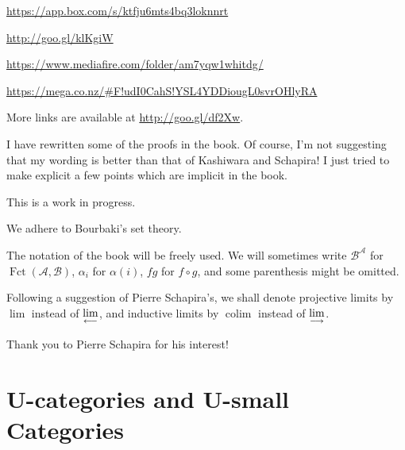 \documentclass[12pt]{article}%
\theoremstyle{remark}
\newtheorem{rk}[thm]{Remark}
\theoremstyle{definition}
\newcommand{\nn}{\noindent}
\newcommand{\A}{\mathcal A}
\newcommand{\B}{\mathcal B}
\newcommand{\ilim}{\operatornamewithlimits{\underset{\longrightarrow}{lim}}}
\newcommand{\plim}{\operatornamewithlimits{\underset{\longleftarrow}{lim}}}
\DeclareMathOperator*{\colim}{colim}
\DeclareMathOperator{\Fct}{Fct}
\begin{document}
\noindent\href{https://app.box.com/s/ktfju6mts4bq3loknnrt}{https://app.box.com/s/ktfju6mts4bq3loknnrt}

\noindent\href{http://goo.gl/klKgiW}{http://goo.gl/klKgiW}

\nn\href{https://www.mediafire.com/folder/am7yqw1whitdg/}{https://www.mediafire.com/folder/am7yqw1whitdg/}

\nn\href{https://mega.co.nz/#F!udI0CahS!YSL4YDDiougL0svrOHlyRA}{https://mega.co.nz/\#F!udI0CahS!YSL4YDDiougL0svrOHlyRA}

More links are available at \href{http://goo.gl/df2Xw}{http://goo.gl/df2Xw}.

 

I have rewritten some of the proofs in the book. Of course, I'm not suggesting that my wording is better than that of Kashiwara and Schapira! I just tried to make explicit a few points which are implicit in the book. 

This is a work in progress. 


We adhere to Bourbaki's set theory.

The notation of the book will be freely used. We will sometimes write $\B^\A$ for $\Fct(\A,\B)$, $\alpha_i$ for $\alpha(i)$, $fg$ for $f\circ g$, and some parenthesis might be omitted. 

Following a suggestion of Pierre Schapira's, we shall denote projective limits by $\lim$ instead of $\plim$, and inductive limits by $\colim$ instead of $\ilim$. 

Thank you to Pierre Schapira for his interest!


\section{U-categories and U-small Categories}\label{ucat}
\end{document}
